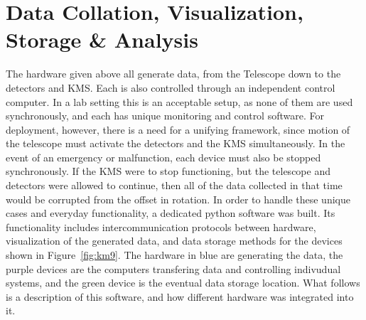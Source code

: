 \documentclass[manuscript]{aastex}
\begin{document}
\newpage
\section{Data Collation, Visualization, Storage \& Analysis}
The hardware given above all generate data, from the Telescope down to the detectors and KMS. Each is also controlled through an independent control computer. In a lab setting this is an acceptable setup, as none of them are used synchronously, and each has unique monitoring and control software. For deployment, however, there is a need for a unifying framework, since motion of the telescope must activate the detectors and the KMS simultaneously. In the event of an emergency or malfunction, each device must also be stopped synchronously. If the KMS were to stop functioning, but the telescope and detectors were allowed to continue, then all of the data collected in that time would be corrupted from the offset in rotation. In order to handle these unique cases and everyday functionality, a dedicated python software was built. Its functionality includes intercommunication protocols between hardware, visualization of the generated data, and data storage methods for the devices shown in Figure~\ref{fig:km9}. The hardware in blue are generating the data, the purple devices are the computers transfering data and controlling indivudual systems, and the green device is the eventual data storage location. What follows is a description of this software, and how different hardware was integrated into it.
\end{document}
